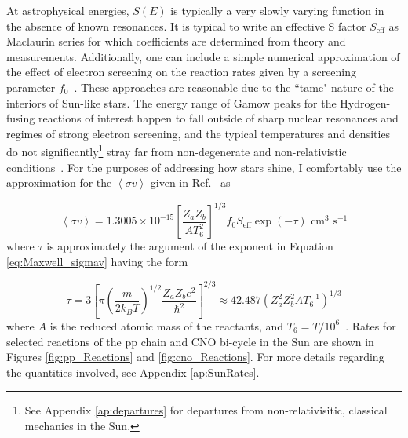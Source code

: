 \documentclass[12pt]{article}
\newcommand{\bigparenthesis}[1]{\left(#1\right)}
\begin{document}
At astrophysical energies, $S(E)$ is typically a very slowly varying function in the absence of known resonances. It is typical to write an effective S factor $S_\mathrm{eff}$ as Maclaurin series for which coefficients are determined from theory and measurements. Additionally, one can include a simple numerical approximation of the effect of electron screening on the reaction rates given by a screening parameter $f_0$~\cite{Saltpeter1954}. These approaches are reasonable due to the ``tame" nature of the interiors of Sun-like stars. The energy range of Gamow peaks for the Hydrogen-fusing reactions of interest happen to fall outside of sharp nuclear resonances and regimes of strong electron screening, and the typical temperatures and densities do not significantly\footnote{See Appendix \ref{ap:departures} for departures from non-relativisitic, classical mechanics in the Sun.} stray far from non-degenerate and non-relativistic conditions~\cite{Clayton1983,Cox_Giuli_vol1,Christensen_Dalsgaard_2021}. For the purposes of addressing how stars shine, I comfortably use the approximation for the $\left<\sigma v\right>$ given in Ref.~\cite{bahcall1989neutrino} as


\begin{equation}
    \left<\sigma v \right> = 1.3005 \times 10^{-15} \left[\frac{Z_a Z_b}{A T_6^2}\right]^{1/3} f_0 S_\mathrm{eff} \exp{(-\tau)} \text{ cm}^{3} \text{ s}^{-1} \label{eq:sigmav_approximation}
\end{equation}
%
where $\tau$ is approximately the argument of the exponent in Equation \ref{eq:Maxwell_sigmav} having the form

\begin{equation}
    \tau = 3 \left[\pi \bigparenthesis{\frac{m}{2k_B T}}^{1/2} \frac{Z_a Z_b e^2}{\hbar^2} \right]^{2/3} \approx 42.487 (Z_a^2 Z_b^2 A T_6^{-1})^{1/3}
\end{equation}
%
where $A$ is the reduced atomic mass of the reactants, and $T_6 = T/10^6$~\cite{KWW_book,bahcall1989neutrino}. Rates for selected reactions of the pp chain and CNO bi-cycle in the Sun are shown in Figures \ref{fig:pp_Reactions} and \ref{fig:cno_Reactions}. For more details regarding the quantities involved, see Appendix \ref{ap:SunRates}.
\end{document}
